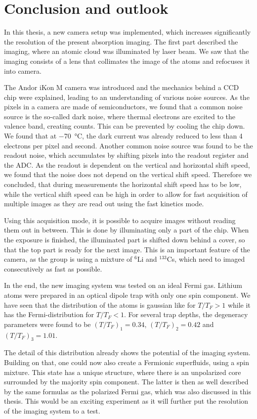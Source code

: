\chapter{Conclusion and outlook}

In this thesis, a new camera setup was implemented, which increases significantly the resolution of the present absorption imaging. The first part described the imaging, where an atomic cloud was illuminated by laser beam. We saw that the imaging consists of a lens that collimates the image of the atoms and refocuses it into camera.

The Andor iKon M camera was introduced and the mechanics behind a CCD chip were explained, leading to an understanding of various noise sources. As the pixels in a camera are made of semiconductors, we found that a common noise source is the so-called dark noise, where thermal electrons are excited to the valence band, creating counts. This can be prevented by cooling the chip down. We found that at \SI{-70}{\degreeCelsius}, the dark current was already reduced to less than 4 electrons per pixel and second. Another common noise source was found to be the readout noise, which accumulates by shifting pixels into the readout register and the ADC.
As the readout is dependent on the vertical and horizontal shift speed, we found that the noise does not depend on the vertical shift speed. Therefore we concluded, that during measurements the horizontal shift speed has to be low, while the vertical shift speed can be high in order to allow for fast acquisition of multiple images as they are read out using the fast kinetics mode.

Using this acquisition mode, it is possible to acquire images without reading them out in between. This is done by illuminating only a part of the chip. When the exposure is finished, the illuminated part is shifted down behind a cover, so that the top part is ready for the next image. This is an important feature of the camera, as the group is using a mixture of $^6$Li and $^{133}$Cs, which need to imaged consecutively as fast as possible.

In the end, the new imaging system was tested on an ideal Fermi gas. Lithium atoms were prepared in an optical dipole trap with only one spin component. We have seen that the distribution of the atoms is gaussian like for $T/T_F > 1$ while it has the Fermi-distribution for $T/T_F < 1$. For several trap depths, the degeneracy parameters were found to be $(T/T_F)_1 = 0.34$, $(T/T_F)_2 = 0.42$ and $(T/T_F)_3 = 1.01$.

The detail of this distribution already shows the potential of the imaging system. Building on that, one could now also create a Fermionic superfluids, using a spin mixture. This state has a unique structure, where there is an unpolarized core surrounded by the majority spin component\cite{Shin2006,Zwierlein2006b}. The latter is then as well described by the same formulas as the polarized Fermi gas, which was also discussed in this thesis. This would be an exciting experiment as it will further put the resolution of the imaging system to a test.
